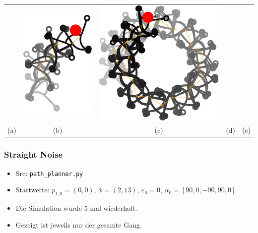\documentclass[10pt,a4paper]{article}
\begin{document}
\begin{tabular}{ccccc}
&
\includegraphics[scale=.5]{pics/pathplanner_with_noise/example_curve_04/gait.pdf}
&
\includegraphics[scale=.5]{pics/pathplanner_with_noise/example_curve_05/gait.pdf}
\\
(a) & (b) & (c) & (d) & (e) 
\\
\end{tabular}

\subsubsection{Straight Noise}

\begin{itemize}
	\item Src: \texttt{path\_planner.py}
	
	\item Startwerte: $p_{1,0} = (0,0)$, $\bar{x} = (2,13)$, $\varepsilon_0 = 0$, $\alpha_0 = [90,0,-90,90,0]$
	
	\item Die Simulation wurde 5 mal wiederholt.
	
	\item Gezeigt ist jeweils nur der gesamte Gang.

\end{itemize}
\end{document}
